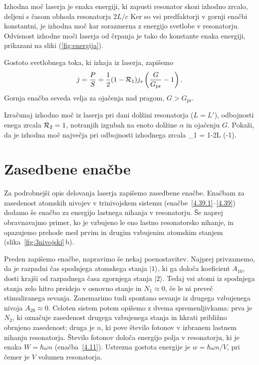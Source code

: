 Izhodna moč laserja je enaka energiji, ki zapusti
resonator skozi izhodno zrcalo, deljeni s časom obhoda resonatorja $2L/c$ 
Ker so vsi predfaktorji v gornji enačbi konstantni, je izhodna moč kar sorazmerna
z energijo svetlobe v resonatorju. Odvisnost izhodne moči laserja od črpanja je 
tako do konstante enaka energiji, prikazani na sliki (\ref{fig:energija}). 

Gostoto svetlobnega toka, ki izhaja iz laserja, zapišemo 
\begin{equation}
 j = \frac{P}{S} = \frac{1}{2} (1-{\cal {R}}_{1}) j_s \left(\frac{G}{G_\mathrm{pr}}-1\right).
\end{equation}
Gornja enačba seveda velja za ojačenja nad pragom, $G>G_\mathrm{pr}$.

\begin{definition}
Izračunaj izhodno moč iz laserja pri dani dolžini resonatorja ($L=L'$), 
odbojnosti enega zrcala ${\cal {R}}_{2}=1$, 
notranjih izgubah na enoto dolžine $\alpha$ in ojačenju $G$. Pokaži, da
je izhodna moč največja pri odbojnosti izhodnega zrcala 
\beq
{}_1 = 1-2\alpha L \left(-1\right).
\eeq
\end{definition}

\section{Zasedbene enačbe}
Za podrobnejši opis delovanja laserja zapišemo zasedbene enačbe. 
Enačbam za zasedenost atomskih nivojev 
v trinivojskem sistemu (enačbe~\ref{4.39.1}--\ref{4.39}) dodamo še enačbo za 
energijo lastnega nihanja v resonatorju. Še naprej obravnavajmo primer, ko je 
vzbujeno le eno lastno resonatorsko nihanje, in opazujemo prehode  med prvim 
in drugim vzbujenim atomskim stanjem (slika~\ref{fig:3nivojski}\,b). 

Preden zapišemo enačbe, napravimo še nekaj poenostavitev. Najprej privzamemo, 
da je razpadni čas spodnjega atomskega stanja $|1\rangle$, 
ki ga določa koeficient $A_{10}$, dosti krajši od razpadnega
časa zgornjega stanja $|2\rangle$. Tedaj vsi atomi iz spodnjega stanja zelo 
hitro preidejo v osnovno stanje in $N_1 \approx 0$, če le ni preveč
stimuliranega sevanja. Zanemarimo tudi spontano sevanje iz drugega vzbujenega
nivoja $A_{20} \approx 0$. Celoten sistem potem opišemo z dvema 
spremenljivkama: prva je $N_2$, ki označuje zasedenost drugega vzbujenega
stanja in hkrati približno obrnjeno zasedenost; druga je $n$, ki pove število
fotonov v izbranem lastnem nihanju resonatorja. Število fotonov določa energijo 
polja v resonatorju, ki je enaka $W = \hbar\omega n$ (enačba~\ref{4.11}). Ustrezna
gostota energije je $w = \hbar\omega n/V$, pri čemer je $V$ volumen resonatorja.

